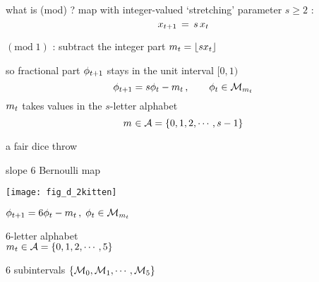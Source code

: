 \begin{frame}{what is ({mod}) ?}
\renewcommand{\ssp}{\ensuremath{x}}             %
map with integer-valued {\color{blue}`stretching' parameter $s\geq2$} :
\[
\ssp_{\zeit+1} \,=\, {s}\,\ssp_{\zeit}
\] %

$(\mbox{mod}\;1)$ :
subtract the integer part
\(
\Ssym{\zeit}=\left\lfloor{s}\ssp_{\zeit}\right\rfloor
\)

\renewcommand{\ssp}{\ensuremath{\phi}}             %
so fractional part
$\ssp_{\zeit+1}$ stays in the unit interval $[0,1)$
\[
\ssp_{\zeit+1}
= {s} \ssp_{\zeit} - \Ssym{\zeit}
\,,\qquad  \ssp_{\zeit}\in\pS_{\Ssym{\zeit}}
\] %
${m_{t}}$ takes values in the ${s}$-letter alphabet
\[
{m_{}} \in \mathcal{A}=\{0,1,2,\cdots,s-1\}
\] %
\end{frame} %

\renewcommand{\ssp}{\ensuremath{\phi}}             %
\renewcommand{\ssp}{\ensuremath{\phi}}             %

\begin{frame}{a fair dice throw}
    \begin{block}{slope ${6}$ Bernoulli map}
\begin{center}
            \begin{minipage}[c]{0.32\textwidth}\begin{center}
\texttt{[image: fig\_d\_2kitten]} %
            \end{center}\end{minipage}
            \hspace{2ex}
            \begin{minipage}[c]{0.46\textwidth}
\(
\ssp_{\zeit+1}
= {6} \ssp_{\zeit} - \Ssym{\zeit}
\,,\;  \ssp_{\zeit}\in\pS_{\Ssym{\zeit}}
\)
\medskip

${6}$-letter alphabet \\
\(
{m_{t}} \in \mathcal{A}=\{0,1,2,\cdots,5\}
\)
            \end{minipage}
\end{center}
$6$ subintervals $\{{\cal M}_{0},{\cal M}_{1},\cdots,{\cal M}_{5}\}$
    \end{block}
\end{frame} %

